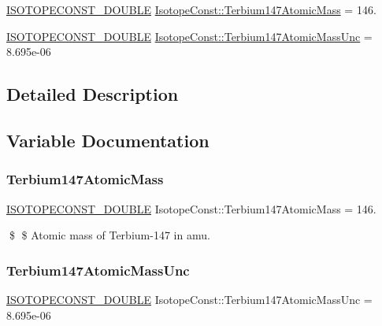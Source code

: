\begin{DoxyCompactItemize}
\item 
\mbox{\hyperlink{group___isotope_const-_macros_ga8f45a7272ce02c0b4c65c44636ed719a}{I\+S\+O\+T\+O\+P\+E\+C\+O\+N\+S\+T\+\_\+\+D\+O\+U\+B\+LE}} \mbox{\hyperlink{group___isotope_const-_terbium-_tb147_gad7ec66f725a66486465771a47637c4bc}{Isotope\+Const\+::\+Terbium147\+Atomic\+Mass}} = 146.
\item 
\mbox{\hyperlink{group___isotope_const-_macros_ga8f45a7272ce02c0b4c65c44636ed719a}{I\+S\+O\+T\+O\+P\+E\+C\+O\+N\+S\+T\+\_\+\+D\+O\+U\+B\+LE}} \mbox{\hyperlink{group___isotope_const-_terbium-_tb147_gaf42813f7abe7684faf1a0d803a934e8b}{Isotope\+Const\+::\+Terbium147\+Atomic\+Mass\+Unc}} = 8.\+695e-\/06
\end{DoxyCompactItemize}


\subsection{Detailed Description}


\subsection{Variable Documentation}
\mbox{\label{group___isotope_const-_terbium-_tb147_gad7ec66f725a66486465771a47637c4bc}} 
\subsubsection{\texorpdfstring{Terbium147\+Atomic\+Mass}{Terbium147AtomicMass}}
{\footnotesize\ttfamily \mbox{\hyperlink{group___isotope_const-_macros_ga8f45a7272ce02c0b4c65c44636ed719a}{I\+S\+O\+T\+O\+P\+E\+C\+O\+N\+S\+T\+\_\+\+D\+O\+U\+B\+LE}} Isotope\+Const\+::\+Terbium147\+Atomic\+Mass = 146.}

\$ \$ Atomic mass of Terbium-\/147 in amu. \mbox{\label{group___isotope_const-_terbium-_tb147_gaf42813f7abe7684faf1a0d803a934e8b}} 
\subsubsection{\texorpdfstring{Terbium147\+Atomic\+Mass\+Unc}{Terbium147AtomicMassUnc}}
{\footnotesize\ttfamily \mbox{\hyperlink{group___isotope_const-_macros_ga8f45a7272ce02c0b4c65c44636ed719a}{I\+S\+O\+T\+O\+P\+E\+C\+O\+N\+S\+T\+\_\+\+D\+O\+U\+B\+LE}} Isotope\+Const\+::\+Terbium147\+Atomic\+Mass\+Unc = 8.\+695e-\/06}

